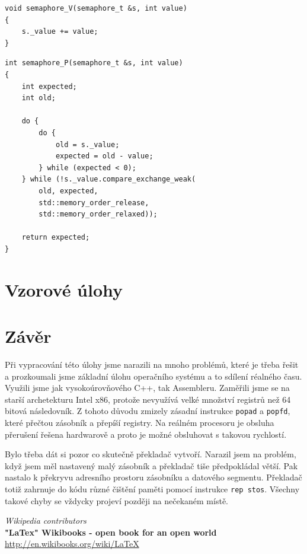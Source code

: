 \documentclass[a4paper,12pt]{article}
\begin{document}
\begin{lstlisting}
void semaphore_V(semaphore_t &s, int value)
{
	s._value += value;
}
\end{lstlisting}
\begin{lstlisting}
int semaphore_P(semaphore_t &s, int value)
{
	int expected;
	int old;

	do {
		do {
			old = s._value;
			expected = old - value;
		} while (expected < 0);
	} while (!s._value.compare_exchange_weak(
		old, expected,
		std::memory_order_release,
		std::memory_order_relaxed));

	return expected;
}
\end{lstlisting}


\section{Vzorové úlohy}

\section{Závěr}
Při vypracování této úlohy jsme narazili na mnoho problémů, které je třeba
řešit a prozkoumali jsme základní úlohu operačního systému a to sdílení réalného času.
Využili jsme jak vysokoúrovňového C++, tak Assembleru. Zaměřili jsme se na starší
archetekturu Intel x86, protože nevyužívá velké množství registrů než 64 bitová
následovník. Z tohoto důvodu zmizely zásadní instrukce \texttt{popad} a \texttt{popfd},
které přečtou zásobník a přepíší registry. Na reálném procesoru je obsluha přerušení řešena
hardwarově a proto je možné obsluhovat s takovou rychlostí.

Bylo třeba dát si pozor co skutečně překladač vytvoří. Narazil jsem na problém, když jsem
měl nastavený malý zásobník a překladač tiše předpokládal větší. Pak nastalo k překryvu
adresního prostoru zásobníku a datového segmentu. Překladač totiž zahrnuje do kódu různé
čištění paměti pomocí instrukce \verb+rep stos+. Všechny takové chyby se vždycky projeví
později na nečekaném místě.

\begin{thebibliography}{9}

{\em Wikipedia contributors} \\
{\bf "LaTex" Wikibooks - open book for an open world} \\
\url{http://en.wikibooks.org/wiki/LaTeX} \\

\end{thebibliography}
\end{document}
